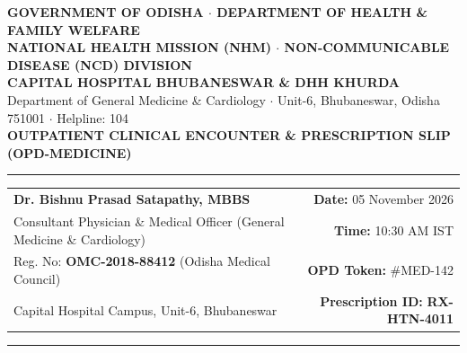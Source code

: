 \documentclass[9pt,a4paper]{article}
\begin{document}
\begin{tcolorbox}[
    colback=white,
    colframe=primary,
    arc=3mm,
    boxrule=1.5pt,
    left=8pt, right=8pt, top=5pt, bottom=5pt
]

\begin{center}
    {\scriptsize\textbf{\color{primarydark}GOVERNMENT OF ODISHA $\cdot$ DEPARTMENT OF HEALTH \& FAMILY WELFARE}}\\[1pt]
    {\scriptsize\textbf{\color{accent}NATIONAL HEALTH MISSION (NHM) $\cdot$ NON-COMMUNICABLE DISEASE (NCD) DIVISION}}\\[2pt]
    {\Large\textbf{\color{primary}CAPITAL HOSPITAL BHUBANESWAR \& DHH KHURDA}}\\[1pt]
    {\footnotesize Department of General Medicine \& Cardiology $\cdot$ Unit-6, Bhubaneswar, Odisha 751001 $\cdot$ Helpline: 104}\\[1pt]
    {\scriptsize\textbf{OUTPATIENT CLINICAL ENCOUNTER \& PRESCRIPTION SLIP (OPD-MEDICINE)}}
\end{center}

\vspace{-6pt}
\noindent\textcolor{primary}{\rule{\linewidth}{1.2pt}}

\vspace{1pt}
\begin{tabularx}{\linewidth}{@{}Xr@{}}
    \textbf{\large Dr. Bishnu Prasad Satapathy, MBBS} & \textbf{Date:} 05 November 2026 \\
    Consultant Physician \& Medical Officer (General Medicine \& Cardiology) & \textbf{Time:} 10:30 AM IST \\
    Reg. No: \textbf{\color{primarydark}OMC-2018-88412} (Odisha Medical Council) & \textbf{OPD Token:} \#MED-142 \\
    Capital Hospital Campus, Unit-6, Bhubaneswar & \textbf{Prescription ID:} \textbf{\color{accent}RX-HTN-4011} \\
\end{tabularx}

\vspace{1pt}
\noindent\textcolor{linegray}{\rule{\linewidth}{0.6pt}}


\end{tcolorbox}
\end{document}
